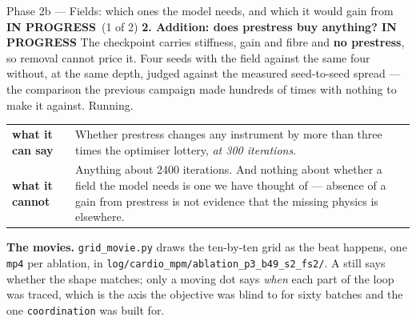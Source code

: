 \documentclass[11pt,a4paper]{article}
\newcommand{\code}[1]{\texttt{#1}}
\newcommand{\prog}{\textcolor{warn}{\textbf{IN PROGRESS}}}
\begin{document}
\begin{phasebox}{Phase 2b --- Fields: which ones the model needs, and which it would gain from \hfill \prog\ (1 of 2)}
\textbf{2. Addition: does prestress buy anything? \prog} The checkpoint carries stiffness, gain and
fibre and \textbf{no prestress}, so removal cannot price it. Four seeds with the field against the
same four without, at the same depth, judged against the measured seed-to-seed spread --- the
comparison the previous campaign made hundreds of times with nothing to make it against. Running.

\begin{center}\footnotesize
\begin{tabular}{@{}l p{10.2cm}@{}}
\toprule
\textbf{what it can say} & Whether prestress changes any instrument by more than three times the
optimiser lottery, \emph{at 300 iterations}.\\
\addlinespace
\textbf{what it cannot} & Anything about 2400 iterations. And nothing about whether a field the
model needs is one we have thought of --- absence of a gain from prestress is not evidence that the
missing physics is elsewhere.\\
\bottomrule
\end{tabular}
\end{center}

\textbf{The movies.} \code{grid\_movie.py} draws the ten-by-ten grid as the beat happens, one
\code{mp4} per ablation, in \code{log/cardio\_mpm/ablation\_p3\_b49\_s2\_fs2/}. A still says whether
the shape matches; only a moving dot says \emph{when} each part of the loop was traced, which is the
axis the objective was blind to for sixty batches and the one \code{coordination} was built for.

\end{phasebox}
\end{document}
